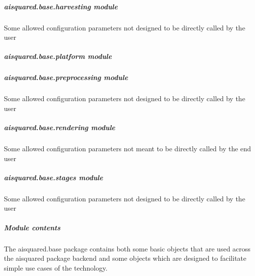 \documentclass[letterpaper,10pt,english]{sphinxmanual}
\begin{document}
\subparagraph{aisquared.base.harvesting module}
\label{\detokenize{aisquared.base:module-aisquared.base.harvesting}}\label{\detokenize{aisquared.base:aisquared-base-harvesting-module}}
\sphinxAtStartPar
Some allowed configuration parameters \sphinxhyphen{} not designed to be directly called by the user


\subparagraph{aisquared.base.platform module}
\label{\detokenize{aisquared.base:module-aisquared.base.platform}}\label{\detokenize{aisquared.base:aisquared-base-platform-module}}

\subparagraph{aisquared.base.preprocessing module}
\label{\detokenize{aisquared.base:module-aisquared.base.preprocessing}}\label{\detokenize{aisquared.base:aisquared-base-preprocessing-module}}
\sphinxAtStartPar
Some allowed configuration parameters \sphinxhyphen{} not designed to be directly called by the user


\subparagraph{aisquared.base.rendering module}
\label{\detokenize{aisquared.base:module-aisquared.base.rendering}}\label{\detokenize{aisquared.base:aisquared-base-rendering-module}}
\sphinxAtStartPar
Some allowed configuration parameters \sphinxhyphen{} not meant to be directly called by the end user


\subparagraph{aisquared.base.stages module}
\label{\detokenize{aisquared.base:module-aisquared.base.stages}}\label{\detokenize{aisquared.base:aisquared-base-stages-module}}
\sphinxAtStartPar
Some allowed configuration parameters \sphinxhyphen{} not designed to be directly called by the user


\subparagraph{Module contents}
\label{\detokenize{aisquared.base:module-aisquared.base}}\label{\detokenize{aisquared.base:module-contents}}
\sphinxAtStartPar
The aisquared.base package contains both some basic objects that are used across the aisquared package backend and some objects which are designed to facilitate simple use cases of the technology.
\end{document}
